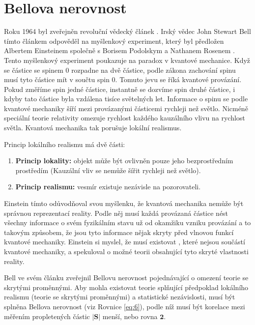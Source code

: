 \section{Bellova nerovnost}

Roku 1964 byl zveřejněn revoluční vědecký článek \parencite{bellineq}. Irský vědec John Stewart Bell tímto článkem odpověděl na myšlenkový experiment, který byl předložen Albertem Einsteinem společně s Borisem Podolskym a Nathanem Rosenem \parencite*{eprpar}. Tento myšlenkový experiment poukazuje na paradox v kvantové mechanice. Když se částice se spinem 0 rozpadne na dvě částice, podle zákona zachování spinu musí tyto částice mít v součtu spin 0. Tomuto jevu se říká kvantové provázání. Pokud změříme spin jedné částice, instantně se dozvíme spin druhé částice, i kdyby tato částice byla vzdálena tisíce světelných let. Informace o spinu se podle kvantové mechaniky šíří mezi provázanými částicemi rychleji než světlo. Nicméně speciální teorie relativity omezuje rychlost každého kauzálního vlivu na rychlost světla. Kvantová mechanika tak porušuje lokální realismus.

Princip lokálního realismu má dvě části:
    \begin{enumerate}
        \item \textbf{Princip lokality:} objekt může být ovlivněn pouze jeho bezprostředním prostředím (Kauzální vliv se nemůže šířit rychleji než světlo). \parencite{lokalita}
        \item \textbf{Princip realismu:} vesmír existuje nezávisle na pozorovateli. \parencite{realismus}
    \end{enumerate}
    
Einstein tímto odůvodňoval svou myšlenku, že kvantová mechanika nemůže být správnou reprezentací reality. Podle něj musí každá provázaná částice nést všechny informace o svém fyzikálním stavu už od okamžiku vzniku provázání a to takovým způsobem, že jsou tyto informace nějak skryty před vlnovou funkcí kvantové mechaniky. Einstein si myslel, že musí existovat , které nejsou součástí kvantové mechaniky, a spekuloval o možné teorii obsahující tyto skryté vlastnosti reality.

Bell ve svém článku \parencite*{bellineq} zveřejnil Bellovu nerovnost pojednávající o omezení teorie se skrytými proměnnými. Aby mohla existovat teorie splňující předpoklad lokálního realismu (teorie se skrytými proměnnými) a statistické nezávislosti, musí být splněna Bellova nerovnost (viz Rovnice \ref{eq:6}), podle níž musí být korelace mezi měřením propletených částic $\bm{|S|}$ menší, nebo rovna $\bm{2}$.

